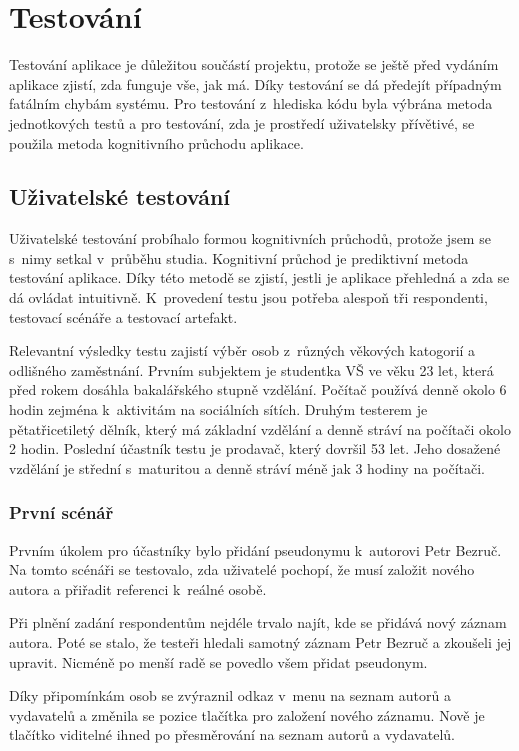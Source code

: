 
\chapter{Testování}
        Testování aplikace je důležitou součástí projektu, protože se ještě před vydáním aplikace zjistí, zda funguje vše, jak má. Díky testování se dá předejít případným fatálním chybám systému. Pro testování z~hlediska kódu byla výbrána metoda jednotkových testů a pro testování, zda je prostředí uživatelsky přívětivé, se použila metoda kognitivního průchodu aplikace.
        
    \section{Uživatelské testování}
        Uživatelské testování probíhalo formou kognitivních průchodů, protože jsem se s~nimy setkal v~průběhu studia. Kognitivní průchod je prediktivní metoda testování aplikace. Díky této metodě se zjistí, jestli je aplikace přehledná a zda se dá ovládat intuitivně. K~provedení testu jsou potřeba alespoň tři respondenti, testovací scénáře a testovací artefakt. 
        
        Relevantní výsledky testu zajistí výběr osob z~různých věkových katogorií a odlišného zaměstnání. Prvním subjektem je studentka VŠ ve věku 23 let, která před rokem dosáhla bakalářského stupně vzdělání. Počítač používá denně okolo 6 hodin zejména k~aktivitám na sociálních sítích. Druhým testerem je pětatřicetiletý dělník, který má základní vzdělání a denně stráví na počítači okolo 2 hodin. Poslední účastník testu je prodavač, který dovršil 53 let. Jeho dosažené vzdělání je střední s~maturitou a denně stráví méně jak 3 hodiny na počítači.
        
        \subsection{První scénář}
            Prvním úkolem pro účastníky bylo přidání pseudonymu k~autorovi Petr Bezruč. Na tomto scénáři se testovalo, zda uživatelé pochopí, že musí založit nového autora a přiřadit referenci k~reálné osobě.
            
            Při plnění zadání respondentům nejdéle trvalo najít, kde se přidává nový záznam autora. Poté se stalo, že testeři hledali samotný záznam Petr Bezruč a zkoušeli jej upravit. Nicméně po menší radě se povedlo všem přidat pseudonym.
            
            Díky připomínkám osob se zvýraznil odkaz v~menu na seznam autorů a vydavatelů a změnila se pozice tlačítka pro založení nového záznamu. Nově je tlačítko viditelné ihned po přesměrování na seznam autorů a vydavatelů. 

